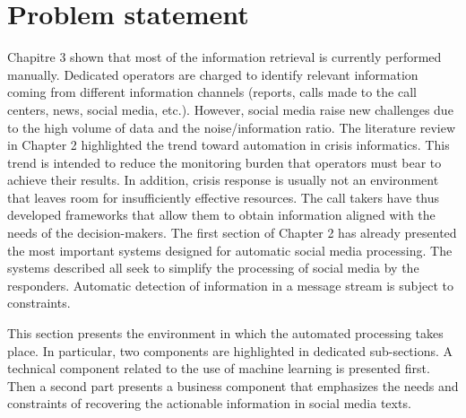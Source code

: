 \section{Problem statement}
Chapitre 3 shown that most of the information retrieval is currently performed manually.
Dedicated operators are charged to identify relevant information coming from different information channels (reports, calls made to the call centers, news, social media, etc.).
However, social media raise new challenges due to the high volume of data and the noise/information ratio.
The literature review in Chapter 2 highlighted the trend toward automation in crisis informatics.
This trend is intended to reduce the monitoring burden that operators must bear to achieve their results.
In addition, crisis response is usually not an environment that leaves room for insufficiently effective resources.
The call takers have thus developed frameworks that allow them to obtain information aligned with the needs of the decision-makers.
The first section of Chapter 2 has already presented the most important systems designed for automatic social media processing.
The systems described all seek to simplify the processing of social media by the responders.
Automatic detection of information in a message stream is subject to constraints.

This section presents the environment in which the automated processing takes place.
In particular, two components are highlighted in dedicated sub-sections.
A technical component related to the use of machine learning is presented first.
Then a second part presents a business component that emphasizes the needs and constraints of recovering the actionable information in social media texts.


